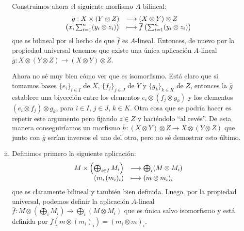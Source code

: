 \documentclass[../../../main.tex]{subfiles}
\begin{document}
\begin{sol}
\begin{enumerate}[(i)]
    Construimos ahora el siguiente morfismo $A$-bilineal:
    \begin{equation}
        \notag
        \begin{array}{rl}
            g:X\times (Y\otimes Z) & \longrightarrow (X\otimes Y)\otimes Z \\
            \left(x,\sum_{i=1}^n(y_i\otimes z_i)\right) & \longmapsto \overline{f}\left(\sum_{i=1}^n(y_i\otimes z_i)\right)
        \end{array}
    \end{equation}
    que es bilineal por el hecho de que $\overline{f}$ es $A$-lineal. Entonces, de nuevo por la propiedad universal tenemos que existe una única aplicación $A$-lineal $\overline{g}:X\otimes(Y\otimes Z)\to (X\otimes Y)\otimes Z$. 
    
    Ahora no sé muy bien cómo ver que es isomorfismo. Está claro que si tomamos bases $\{e_i\}_{i\in I}$ de $X$, $\{f_j\}_{j\in J}$ de $Y$ y $\{g_k\}_{k\in K}$ de $Z$, entonces la $\overline{g}$ establece una biyección entre los elementos $e_i\otimes(f_j\otimes g_k)$ y los elementos $(e_i\otimes f_j)\otimes g_k$, para $i\in I$, $j\in J$, $k\in K$. Otra cosa que se podría hacer es repetir este argumento pero fijando $z\in Z$ y haciéndolo ``al revés''. De esta manera conseguiríamos un morfismo $\overline{h}:(X\otimes Y)\otimes Z\to X\otimes (Y\otimes Z)$ que junto con $\overline{g}$ serían inversos el uno del otro, pero no sé demostrar esto último. 
    
    \item Definimos primero la siguiente aplicación:
    \begin{equation}
        \notag
        \begin{array}{rl}
            M\times\left(\bigoplus_{i\in I}M_i\right) & \longrightarrow \bigoplus_i(M\otimes M_i) \\
            (m,(m_i)_i) & \longmapsto (m\otimes m_i)_i
        \end{array}
    \end{equation}
    que es claramente bilineal y también bien definida. Luego, por la propiedad universal, podemos definir la aplicación $A$-lineal $\overline{f}:M\otimes(\bigoplus_iM_i)\to \bigoplus_i(M\otimes M_i)$ que es única salvo isomorfismo y está definida por $\overline{f}(m\otimes (m_i)_i) = (m_i\otimes m)_i$.
    

\end{enumerate}
\end{sol}
\end{document}
